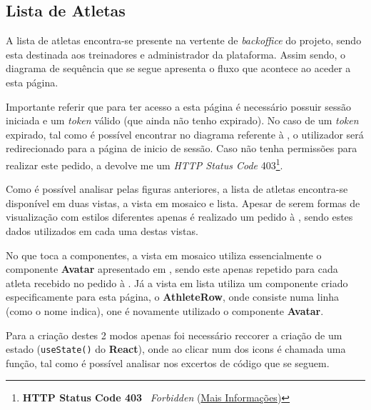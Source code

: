 \subsection{Lista de Atletas}
\label{athletesSequenceDiagram}

A lista de atletas encontra-se presente na vertente de \textit{backoffice} do projeto, sendo esta destinada aos treinadores e administrador da plataforma. Assim sendo, o diagrama de sequência que se segue apresenta o fluxo que acontece ao aceder a esta página.


Importante referir que para ter acesso a esta página é necessário possuir sessão iniciada e um \textit{token} válido (que ainda não tenho expirado). No caso de um \textit{token} expirado, tal como é possível encontrar no diagrama referente à , o utilizador será redirecionado para a página de inicio de sessão. Caso não tenha permissões para realizar este pedido, a \textbf{} devolve me um \textit{HTTP Status Code} 403\footnote{\textbf{HTTP Status Code 403 \textemdash} ~\textit{Forbidden} (\href{https://developer.mozilla.org/pt-BR/docs/Web/HTTP/Status/403}{Mais Informações})}.



Como é possível analisar pelas figuras anteriores, a lista de atletas encontra-se disponível em duas vistas, a vista em mosaico e lista. Apesar de serem formas de visualização com estilos diferentes apenas é realizado um pedido à \textbf{}, sendo estes dados utilizados em cada uma destas vistas.

No que toca a componentes, a vista em mosaico utiliza essencialmente o componente \textbf{Avatar} apresentado em , sendo este apenas repetido para cada atleta recebido no pedido à \textbf{}. Já a vista em lista utiliza um componente criado especificamente para esta página, o \textbf{AthleteRow}, onde consiste numa linha (como o nome indica), one é novamente utilizado o componente \textbf{Avatar}.

Para a criação destes 2 modos apenas foi necessário reccorer a criação de um estado (\texttt{useState()} do \textbf{React}), onde ao clicar num dos icons é chamada uma função, tal como é possível analisar nos excertos de código que se seguem.

